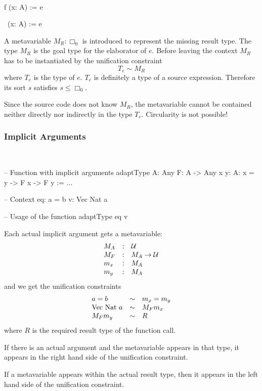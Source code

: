 \ \begin{alba}
    f (x: A)  := e

    \ (x: A)  := e
\end{alba}

A metavariable $M_R: \Box_0$ is introduced to represent the missing result type.
The type $M_R$ is the goal type for the elaborator of $e$. Before leaving the
context $M_R$ has to be instantiated by the unification constraint
$$
    T_e \sim M_R
$$
where $T_e$ is the type of $e$. $T_e$ is definitely a type of a source
expression. Therefore its sort $s$ satisfies $s \le \Box_0$.

Since the source code does not know $M_R$, the metavariable cannot be contained
neither directly nor indirectly in the type $T_e$. Circularity is not possible!



\subsubsection{Implicit Arguments}

\ \begin{alba}
    -- Function with implicit arguments
    adaptType {A: Any} {F: A -> Any} {x y: A}: x = y -> F x -> F y := ...

    -- Context
    eq: a = b
    v:  Vec Nat a

    -- Usage of the function
    adaptType eq v
\end{alba}

Each actual implicit argument gets a metavariable:
$$
\begin{array}{lllll} 
    M_A  &:&  {\mathcal U}
    \\
    M_F  &:&  M_A \to {\mathcal U}
    \\
    m_x  &:&  M_A
    \\
    m_y  &:&  M_A
 \end{array}
$$
and we get the unification constraints
$$
\begin{array}{lllll} 
    a = b              &\sim&    m_x = m_y
    \\
    \text{Vec Nat } a  &\sim&    M_F m_x
    \\
    M_F m_y            &\sim&    R
 \end{array}
$$
where $R$ is the required result type of the function call.

If there is an actual argument and the metavariable appears in that type, it
appears in the right hand side of the unification constraint.

If a metavariable appears within the actual result type, then it appears in the
left hand side of the unification constraint.



